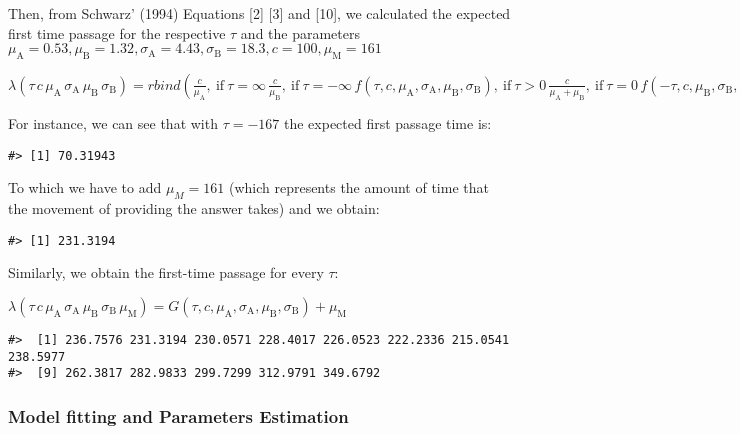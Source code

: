 Then, from Schwarz' (1994) Equations {[}2{]} {[}3{]} and {[}10{]}, we calculated the expected first time passage for the respective \(\tau\) and the parameters \(\mu_ \mathrm A = 0.53, \mu_ \mathrm B = 1.32, \sigma_ \mathrm A = 4.43, \sigma_ \mathrm B = 18.3, c = 100, \mu_\mathrm M = 161\)

\({{\lambda\left({\tau{\,{c}{\,{\mu_\mathrm{A}}{\,{\sigma_\mathrm{A}}{\,{\mu_\mathrm{B}}{\,{\sigma_\mathrm{B}}}}}}}}\right)}={{rbind}\left({\displaystyle{\frac{{c}}{{\mu_\mathrm{A}}}},\ \mathrm{if}\ {\tau=\infty}{\,\displaystyle{\frac{{c}}{{\mu_\mathrm{B}}}},\ \mathrm{if}\ {\tau={-\infty}}{\,{{f}\left({\tau{,{c}{,{\mu_\mathrm{A}}{,{\sigma_\mathrm{A}}{,{\mu_\mathrm{B}}{,{\sigma_\mathrm{B}}}}}}}}\right)},\ \mathrm{if}\ {\tau>{0}}{\,\displaystyle{\frac{{c}}{{{\mu_\mathrm{A}}+{\mu_\mathrm{B}}}}},\ \mathrm{if}\ {\tau={0}}{\,{{f}\left({{-\tau}{,{c}{,{\mu_\mathrm{B}}{,{\sigma_\mathrm{B}}{,{\mu_\mathrm{A}}{,{\sigma_\mathrm{A}}}}}}}}\right)},\ \mathrm{if}\ {\tau<{0}}}}}}}\right)}}\)

For instance, we can see that with \(\tau = -167\) the expected first passage time is:

\begin{verbatim}
#> [1] 70.31943
\end{verbatim}

To which we have to add \(\mu_M = 161\) (which represents the amount of time that the movement of providing the answer takes) and we obtain:

\begin{verbatim}
#> [1] 231.3194
\end{verbatim}

Similarly, we obtain the first-time passage for every \(\tau\):

\({{\lambda\left({\tau{\,{c}{\,{\mu_\mathrm{A}}{\,{\sigma_\mathrm{A}}{\,{\mu_\mathrm{B}}{\,{\sigma_\mathrm{B}}{\,{\mu_\mathrm{M}}}}}}}}}\right)}={{{G}\left({\tau{,{c}{,{\mu_\mathrm{A}}{,{\sigma_\mathrm{A}}{,{\mu_\mathrm{B}}{,{\sigma_\mathrm{B}}}}}}}}\right)}+{\mu_\mathrm{M}}}}\)

\begin{verbatim}
#>  [1] 236.7576 231.3194 230.0571 228.4017 226.0523 222.2336 215.0541 238.5977
#>  [9] 262.3817 282.9833 299.7299 312.9791 349.6792
\end{verbatim}

\hypertarget{model-fitting-and-parameters-estimation}{%
\subsubsection{Model fitting and Parameters Estimation}\label{model-fitting-and-parameters-estimation}}

